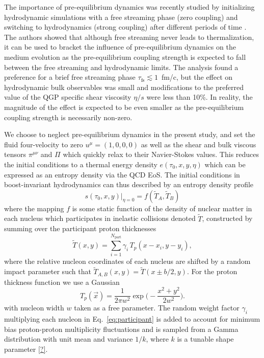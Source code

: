 \documentclass[aps,prc,reprint,amsmath,nofootinbib,superscriptaddress]{revtex4-1}
\newcommand{\T}{\tilde{T}}
\begin{document}
The importance of pre-equilibrium dynamics was recently studied by initializing hydrodynamic simulations with a free streaming phase (zero coupling) and switching to hydrodynamics (strong coupling) after different periods of time \cite{Liu:2015nwa}.
The authors showed that although free streaming never leads to thermalization, it can be used to bracket the influence of pre-equilibrium dynamics on the medium evolution as the pre-equilibrium coupling strength is expected to fall between the free streaming and hydrodynamic limits.
The analysis found a preference for a brief free streaming phase ${\tau_\text{fs} \lesssim 1}$~fm/c, but the effect on hydrodynamic bulk observables was small and modifications to the preferred value of the QGP specific shear viscosity $\eta/s$ were less than 10\%.
In reality, the magnitude of the effect is expected to be even smaller as the pre-equilibrium coupling strength is necessarily non-zero.

We choose to neglect pre-equilibrium dynamics in the present study, and set the fluid four-velocity to zero ${u^\mu = (1,0,0,0)}$ as well as the shear and bulk viscous tensors $\pi^{\mu\nu}$ and $\Pi$ which quickly relax to their Navier-Stokes values.
This reduces the initial conditions to a thermal energy density $e(\tau_0, x, y, \eta)$ which can be expressed as an entropy density via the QCD EoS.
The initial conditions in boost-invariant hydrodynamics can thus described by an entropy density profile
\begin{equation}
  s(\tau_0, x, y)\vert_{\eta=0} = f(\T_A, \T_B)
  \label{eq:mapping}
\end{equation}
where the mapping $f$ is some static function of the density of nuclear matter in each nucleus which participates in inelastic collisions denoted $\T$, constructed by summing over the participant proton thicknesses
\begin{equation}
  \T(x, y) = \sum\limits_{i=1}^{N_\text{part}} \gamma_i\, T_p(x - x_i, y - y_i),
  \label{eq:participant}
\end{equation}
where the relative nucleon coordinates of each nucleus are shifted by a random impact parameter such that ${\T_{A,B}(x, y) = \T(x \pm b/2, y)}$.
For the proton thickness function we use a Gaussian
\begin{equation}
  T_p(\vec{x}) = \frac{1}{2\pi w^2} \exp\bigg(\!-\frac{x^2 + y^2}{2 w^2}\bigg).
\end{equation}
with nucleon width $w$ taken as a free parameter.
The random weight factor $\gamma_i$ multiplying each nucleon in Eq.~\eqref{eq:participant} is added to account for minimum bias proton-proton multiplicity fluctuations and is sampled from a Gamma distribution with unit mean and variance $1/k$, where $k$ is a tunable shape parameter \ref{?}.
\end{document}
